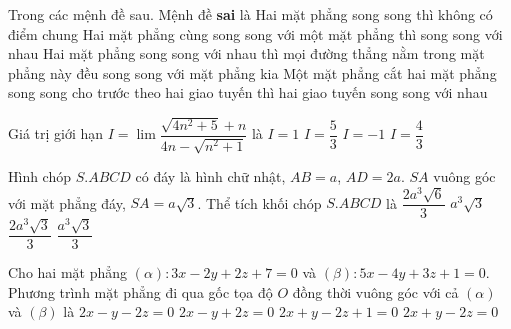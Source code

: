 \begin{ex}%
Trong các mệnh đề sau. Mệnh đề \textbf{sai} là
\choice
{Hai mặt phẳng song song thì không có điểm chung}
{\True Hai mặt phẳng cùng song song với một mặt phẳng thì song song với nhau}
{Hai mặt phẳng song song với nhau thì mọi đường thẳng nằm trong mặt phẳng này đều song song
với mặt phẳng kia}
{Một mặt phẳng cắt hai mặt phẳng song song cho trước theo hai giao tuyến thì hai giao tuyến song
song với nhau}
\end{ex}
\begin{ex}%
Giá trị giới hạn $I = \lim \dfrac{\sqrt{4n^2+5}+n}{4n-\sqrt{n^2+1}}$ là
\choice
{\True $I=1$}
{$I=\dfrac{5}{3}$}
{$I=-1$}
{$I=\dfrac{4}{3}$}
\end{ex}
\begin{ex}%
Hình chóp $S.ABCD$ có đáy là hình chữ nhật, $AB=a$, $AD=2a$. $SA$ vuông góc với mặt phẳng đáy, $SA =a\sqrt{3}$. Thể tích khối chóp $S.ABCD$ là
\choice
{$\dfrac{2a^3\sqrt{6}}{3}$}
{$a^3 \sqrt{3}$}
{\True $\dfrac{2a^3\sqrt{3}}{3}$}
{$\dfrac{a^3\sqrt{3}}{3}$}
\end{ex}
\begin{ex}%
Cho hai mặt phẳng $(\alpha): 3x-2y+2z+7=0$ và $(\beta): 5x-4y+3z+1=0$. Phương trình mặt phẳng đi qua gốc tọa độ $O$ đồng thời vuông góc với cả $(\alpha)$ và $(\beta)$ là
\choice
{$2x-y-2z=0$}
{$2x-y+2z=0$}
{$2x+y-2z+1=0$}
{\True $2x+y-2z=0$}
\end{ex}
